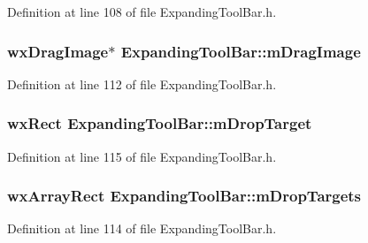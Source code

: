 Definition at line 108 of file Expanding\+Tool\+Bar.\+h.

\subsubsection[{\texorpdfstring{m\+Drag\+Image}{mDragImage}}]{\setlength{\rightskip}{0pt plus 5cm}wx\+Drag\+Image$\ast$ Expanding\+Tool\+Bar\+::m\+Drag\+Image\hspace{0.3cm}{\ttfamily [protected]}}\hypertarget{class_expanding_tool_bar_a22d583cf513d758678fccb788e6d91bc}{}\label{class_expanding_tool_bar_a22d583cf513d758678fccb788e6d91bc}


Definition at line 112 of file Expanding\+Tool\+Bar.\+h.

\subsubsection[{\texorpdfstring{m\+Drop\+Target}{mDropTarget}}]{\setlength{\rightskip}{0pt plus 5cm}wx\+Rect Expanding\+Tool\+Bar\+::m\+Drop\+Target\hspace{0.3cm}{\ttfamily [protected]}}\hypertarget{class_expanding_tool_bar_a5333ab3447084c7a05a2c5bdb22fd375}{}\label{class_expanding_tool_bar_a5333ab3447084c7a05a2c5bdb22fd375}


Definition at line 115 of file Expanding\+Tool\+Bar.\+h.

\subsubsection[{\texorpdfstring{m\+Drop\+Targets}{mDropTargets}}]{\setlength{\rightskip}{0pt plus 5cm}wx\+Array\+Rect Expanding\+Tool\+Bar\+::m\+Drop\+Targets\hspace{0.3cm}{\ttfamily [protected]}}\hypertarget{class_expanding_tool_bar_ac8aa30f137606f247613d02857d36951}{}\label{class_expanding_tool_bar_ac8aa30f137606f247613d02857d36951}


Definition at line 114 of file Expanding\+Tool\+Bar.\+h.


